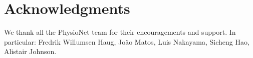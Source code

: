 \documentclass[10pt,letterpaper]{article}
\begin{document}
\section*{Acknowledgments}

We thank all the PhysioNet team for their encouragements and support. In
particular: Fredrik Willumsen Haug, João Matos, Luis Nakayama, Sicheng Hao, Alistair Johnson.

\nolinenumbers

%
%
% 





\end{document}
